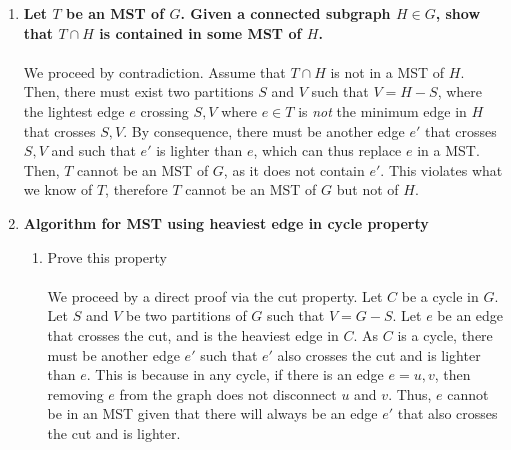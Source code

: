 \documentclass{article}
\begin{document}
\begin{enumerate}
\begin{lstlisting}[escapeinside={(*}{*)}]
return min_path
}
	\end{lstlisting}
	This algorithm leverages Dijkstra's to calculate the shortest path from $s$ and $t$ to each other city in the network. Since any path $s,t$ passing through any edge $e'=u,v$ must pass through $u$ and $v$, then the shortest path \emph{must} take the shortest distance $s,u$ and $v,t$ respectively. Thus by applying this principle on each iteration, and keeping track of the overall minimum, this algorithm finds the best edge to add.
	\\ The problem requires that we give an efficient algorithm, so we show that this runs efficiently. First, this algorithm runs Dijkstra's twice. From this we have $O(2(E+V)\log(E))$, as this is the running time of Dijkstra's multiplied by two. Then, we have a for loop that runs $E'$ times, each time performing a constant operation. Thus this adds a $O(E')$ term to the overall running time. Thus, the overall running time is $O(2(E+V)\log(E)) + O(E') \in O((E+V)\log(E))$. This is an efficient algorithm.
	\item \textbf{Let $T$ be an MST of $G$. Given a connected subgraph $H\in G$, show that $T \cap H$ is contained in some MST of $H$.}
	\\\\ We proceed by contradiction. Assume that $T \cap H $ is not in a MST of $H$. Then, there must exist two partitions $S$ and $V$ such that $V = H - S$, where the lightest edge $e$ crossing $S,V$ where $e \in T$ is \emph{not} the minimum edge in $H$ that crosses $S,V$. By consequence, there must be another edge $e'$ that crosses $S,V$ and such that $e'$ is lighter than $e$, which can thus replace $e$ in a MST. Then, $T$ cannot be an MST of $G$, as it does not contain $e'$. This violates what we know of $T$, therefore $T$ cannot be an MST of $G$ but not of $H$.
	\item \textbf{Algorithm for MST using heaviest edge in cycle property}
	\begin{enumerate}
	\item Prove this property 
	\\ \\ We proceed by a direct proof via the cut property. Let $C$ be a cycle in $G$. Let $S$ and $V$ be two partitions of $G$ such that $V = G - S$. Let $e$ be an edge that crosses the cut, and is the heaviest edge in $C$. As $C$ is a cycle, there must be another edge $e'$ such that $e'$ also crosses the cut and is lighter than $e$. This is because in any cycle, if there is an edge $e = u,v$, then removing $e$ from the graph does not disconnect $u$ and $v$. Thus, $e$ cannot be in an MST given that there will always be an edge $e'$ that also crosses the cut and is lighter.

\end{enumerate}
\end{enumerate}
\end{document}
